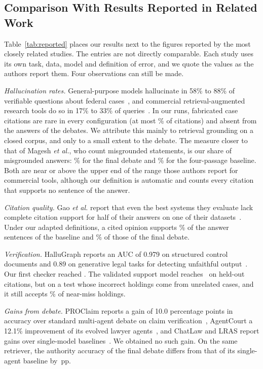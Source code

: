 \documentclass[conference]{IEEEtran}
\newcommand{\pp}{\,pp}
\begin{document}
\subsection{Comparison With Results Reported in Related Work}
Table~\ref{tab:reported} places our results next to the figures reported by the most closely related studies. The entries are not directly comparable. Each study uses its own task, data, model and definition of error, and we quote the values as the authors report them. Four observations can still be made.

\emph{Hallucination rates.} General-purpose models hallucinate in 58\% to 88\% of verifiable questions about federal cases~\cite{dahl2024}, and commercial retrieval-augmented research tools do so in 17\% to 33\% of queries~\cite{magesh2025}. In our runs, fabricated case citations are rare in every configuration (at most \ResStdBaseEightRCitationsFabricated\% of citations) and absent from the answers of the debates. We attribute this mainly to retrieval grounding on a closed corpus, and only to a small extent to the debate. The measure closer to that of Magesh \emph{et al.}, who count misgrounded statements, is our share of misgrounded answers: \ResStdFinalMisgrounded\% for the final debate and \ResStdBaseFourRMisgrounded\% for the four-passage baseline. Both are near or above the upper end of the range those authors report for commercial tools, although our definition is automatic and counts every citation that supports no sentence of the answer.

\emph{Citation quality.} Gao \emph{et al.} report that even the best systems they evaluate lack complete citation support for half of their answers on one of their datasets~\cite{alce}. Under our adapted definitions, a cited opinion supports \ResStdBaseFourRCitationRecall\% of the answer sentences of the baseline and \ResStdFinalCitationRecall\% of those of the final debate.

\emph{Verification.} HalluGraph reports an AUC of 0.979 on structured control documents and 0.89 on generative legal tasks for detecting unfaithful output~\cite{hallugraph}. Our first checker reached \ResStressAUC. The validated support model reaches \ResGateTestAUC\ on held-out citations, but on a test whose incorrect holdings come from unrelated cases, and it still accepts \ResProbeNearMissPct\% of near-miss holdings.

\emph{Gains from debate.} PROClaim reports a gain of 10.0 percentage points in accuracy over standard multi-agent debate on claim verification~\cite{proclaim}, AgentCourt a 12.1\% improvement of its evolved lawyer agents~\cite{agentcourt}, and ChatLaw and LRAS report gains over single-model baselines~\cite{chatlaw,lras}. We obtained no such gain. On the same retriever, the authority accuracy of the final debate differs from that of its single-agent baseline by \ResCmpFinalBaseFourRTargetAnswerDiff\pp.
\end{document}
